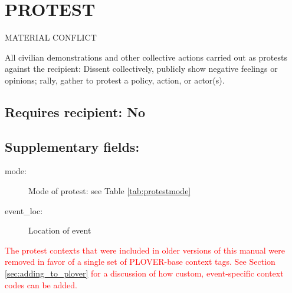 \documentclass[11pt]{report}
\newcommand{\andy}[1]{\textcolor{red}{#1}}
\begin{document}
\newpage  


\section{PROTEST}

\textsf{MATERIAL CONFLICT} \vspace{8pt}

All civilian demonstrations and other collective actions carried out as protests against the recipient: Dissent collectively, publicly show negative feelings or opinions; rally, gather to protest a policy, action, or actor(s).

\subsection{Requires recipient: No}

\subsection{Supplementary fields:}

\begin{description}
	\item[mode:] Mode of protest: see Table \ref{tab:protestmode} 
	\item[event\_loc:] Location of event 
\end{description}

\andy{The protest contexts that were included in older versions of this manual were removed in favor of a single set of PLOVER-base context tags. See Section \ref{sec:adding_to_plover} for a discussion of how custom, event-specific context codes can be added.}
\end{document}
